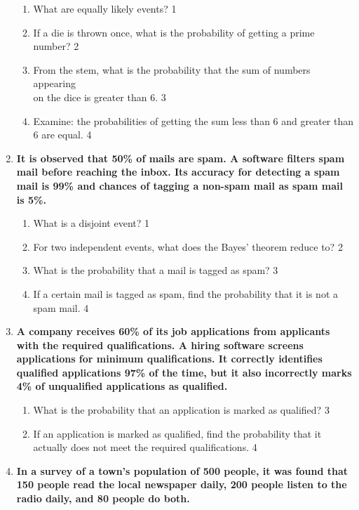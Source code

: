 \documentclass[a4paper,oneside, margin=1.4in]{book}
\begin{document}
\begin{enumerate}
  \begin{enumerate}
    \item
	What are equally likely events? \hfill 1
    \item
	If a die is thrown once, what is the probability of getting a prime number? \hfill 2
    \item  
	From the stem, what is the probability that the sum of numbers appearing \\ on the dice is greater than 6. \hfill 3
    \item
	Examine: the probabilities of getting the sum less than 6 and greater than 6 are equal. \hfill 4
  \end{enumerate}

  
   \item
	  \textbf{It is observed that 50\% of mails are spam. A software filters spam mail before reaching the inbox. Its accuracy for detecting a spam mail is 99\% and chances of tagging a non-spam mail as spam mail is 5\%.} 
  
  \begin{enumerate}
    \item
	What is a disjoint event? \hfill 1
    \item
	For two independent events, what does the Bayes' theorem reduce to? \hfill 2
    \item  
	What is the probability that a mail is tagged as spam?  \hfill 3
    \item
	If a certain mail is tagged as spam, find the probability that it is not a spam mail. \hfill 4
  \end{enumerate}
  
  \item
  \textbf{A company receives 60\% of its job applications from applicants with the required qualifications. A hiring software screens applications for minimum qualifications. It correctly identifies qualified applications 97\% of the time, but it also incorrectly marks 4\% of unqualified applications as qualified.}
  
  \begin{enumerate}
   \item  
    What is the probability that an application is marked as qualified? \hfill 3
   \item
    If an application is marked as qualified, find the probability that it actually does not meet the required qualifications. \hfill 4
  \end{enumerate}

\item
  \textbf{In a survey of a town's population of 500 people, it was found that 150 people read the local newspaper daily, 200 people listen to the radio daily, and 80 people do both.}
 

\end{enumerate}
\end{document}
